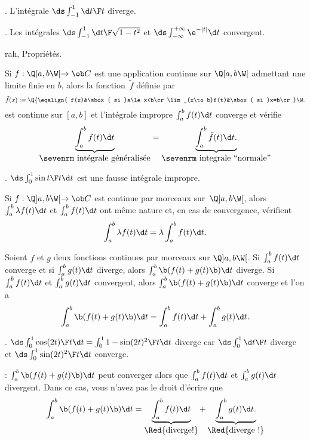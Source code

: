 \Exemple. L'intégrale $\ds\int_{-1}^1{\d t\F t}$ diverge.
\bigskip

\Exemple. Les intégrales $\ds \int_{-1}^1{\d t\F\sqrt{1-t^2}}$ et $\ds\int_{-\infty}^{+\infty}\e^{-|t|}\d t$ 
convergent. 
\bigskip


\Subsection rah, Propriétés.


\Propriete [$(a,b)\in\ob R^2$, $a\le b$] 
Si $f:\Q[a,b\W[\to\ob C$ est une application continue sur $\Q[a,b\W[$ admettant une limite finie en $b$, 
alors la fonction~$\tilde f$ définie par 
$$
\tilde f(x):=\Q\{
\eqalign{
f(x)&\sbox{ si }a\le x<b\cr 
\lim_{x\to b}f(t)&\sbox{ si }x=b\cr}\W.
$$
est continue sur $[a,b]$ et l'intégrale impropre $\int_a^bf(t)\d t$ converge et vérifie 
$$
\underbrace{\int_a^bf(t)\d t}_{\mbox{\sevenrm intégrale généralisée}}
=\underbrace{\int_a^b\tilde f(t)\d t.}_
{\mbox{\sevenrm integrale ``normale''}}
$$


\Exemple. $\ds \int_0^1{\sin t\F t}\d t$ est une fausse intégrale impropre. 
\bigskip


Si $f:\Q]a,b\W[\to\ob C$ est continue par morceaux sur~$\Q]a,b\W[$, alors $\int_a^b \lambda f(t)\d t$ et $\int_a^b f(t)\d t$ ont même nature et, 
en cas de convergence, vérifient 
$$
\int_a^b \lambda f(t)\d t=\lambda \int_a^b f(t)\d t. 
$$


\Propriete [$(a,b)\in\overline{\ob R}^2$] 
Soient $f$ et $g$ deux fonctions continues par morceaux sur $\Q]a,b\W[$. \pn
Si $\int_a^bf(t)\d t$ converge et si $\int_a^bg(t)\d t$ diverge, alors $\int_a^b\b(f(t)+g(t)\b)\d t$ diverge. \medskip\noindent
Si $\int_a^bf(t)\d t$ et $\int_a^bg(t)\d t$ convergent, alors $\int_a^b\b(f(t)+g(t)\b)\d t$ converge et l'on a 
\Equation [\bf addition]
$$
\int_a^b\b(f(t)+g(t)\b)\d t=\int_a^bf(t)\d t+\int_a^bg(t)\d t. 
$$

\Exemple. $\ds\int_0^1{\cos(2t)\F t}\d t=\int_0^1{1-\sin(2t)^2\F t}\d t$ diverge car $\ds\int_0^1{\d t\F t}$ diverge et $\ds\int_0^1{\sin(2t)^2\F t}\d t$ converge. 
\bigskip

\Remarque : $\int_a^b\b(f(t)+g(t)\b)\d t$ peut converger alors que $\int_a^bf(t)\d t$ et $\int_a^bg(t)\d t$ divergent. Dans ce cas, vous n'avez pas le droit d'écrire que 
$$
\int_a^b\b(f(t)+g(t)\b)\d t=\underbrace{\int_a^bf(t)\d t}_{\mbox{\Red{diverge!}}}
+\underbrace{\int_a^bg(t)\d t. }_{\mbox{\Red{diverge !}}}
$$

%

